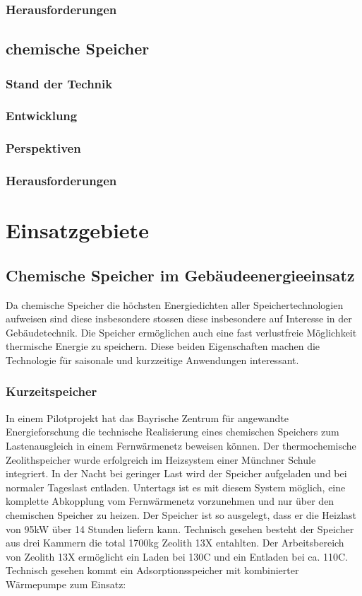 \documentclass[11pt,a4paper]{scrartcl}
\begin{document}
\subsubsection{Herausforderungen}
\subsection{chemische Speicher}
\subsubsection{Stand der Technik}
\subsubsection{Entwicklung}
\subsubsection{Perspektiven}
\subsubsection{Herausforderungen}


\newpage
\section{Einsatzgebiete}
\subsection{Chemische Speicher im Gebäudeenergieeinsatz}
Da chemische Speicher die höchsten Energiedichten aller Speichertechnologien
aufweisen sind diese insbesondere stossen diese insbesondere auf Interesse in
der Gebäudetechnik. Die Speicher ermöglichen auch eine fast verlustfreie
Möglichkeit thermische Energie zu speichern. Diese beiden Eigenschaften machen
die Technologie für saisonale und kurzzeitige Anwendungen interessant.

\subsubsection{Kurzeitspeicher}

In einem Pilotprojekt hat das Bayrische Zentrum für angewandte Energieforschung
die technische Realisierung eines chemischen Speichers zum Lastenausgleich in
einem Fernwärmenetz beweisen können. Der thermochemische Zeolithspeicher wurde
erfolgreich im Heizsystem einer Münchner Schule integriert. In der Nacht bei
geringer Last wird der Speicher aufgeladen und bei normaler Tageslast entladen.
Untertags ist es mit diesem System möglich, eine komplette Abkopplung vom
Fernwärmenetz vorzunehmen und nur über den chemischen Speicher zu heizen. Der
Speicher ist so ausgelegt, dass er die Heizlast von 95kW über 14 Stunden liefern
kann. Technisch gesehen besteht der Speicher aus drei Kammern die total 1700kg
Zeolith 13X entahlten. Der Arbeitsbereich von Zeolith 13X ermöglicht ein Laden
bei 130\textdegree C und ein Entladen bei ca. 110\textdegree C. Technisch
gesehen kommt ein Adsorptionsspeicher mit kombinierter Wärmepumpe zum Einsatz:
\end{document}
